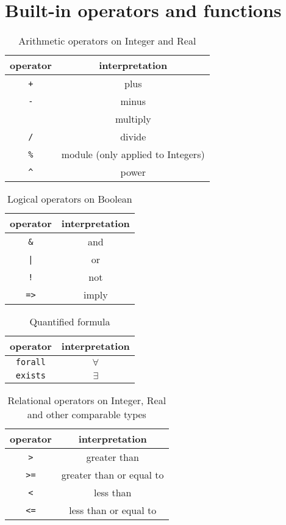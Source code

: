 \documentclass[12pt]{article}
\begin{document}

\appendix

\section{Built-in operators and functions}
\begin{table}[h]
\centering
\caption{Arithmetic operators on Integer and Real}
\begin{tabular}{ c c }
\toprule 
operator & interpretation \\
\midrule
{\tt +} & plus \\ 
{\tt -} & minus \\ 
{\tt *} & multiply \\
{\tt /} & divide \\ 
{\tt \%} & module (only applied to Integers) \\
\verb|^| & power \\
\bottomrule
\end{tabular}
\end{table}

\begin{table}[h]
\centering
\caption{Logical operators on Boolean}
\begin{tabular}{ c c }
\toprule 
operator & interpretation \\
\midrule
{\tt \&} & and \\ 
{\tt |} & or \\ 
{\tt !} & not \\
{\tt =>} & imply \\
\bottomrule
\end{tabular}
\end{table}

\begin{table}[h]
\centering
\caption{Quantified formula}
\begin{tabular}{ c c }
\toprule 
operator & interpretation \\
\midrule
{\tt forall} & $\forall$ \\ 
{\tt exists} & $\exists$ \\ 
\bottomrule
\end{tabular}
\end{table}

\begin{table}[h]
\centering
\caption{Relational operators on Integer, Real and other comparable types}
\begin{tabular}{ c c }
\toprule 
operator & interpretation \\
\midrule
{\tt >} & greater than \\ 
{\tt >=} & greater than or equal to \\ 
{\tt <} & less than \\
{\tt <=} & less than or equal to \\
\bottomrule
\end{tabular}
\end{table}
\end{document}
